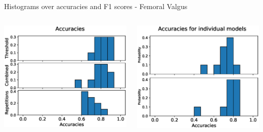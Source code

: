 \begin{frame}[fragile]{Histograms over accuracies and F1 scores - Femoral Valgus}
  \vspace{0.2cm}
  \begin{columns}
  \includegraphics[width=\textwidth]{files/figs/res/femval/acc.eps}

  \includegraphics[width=\textwidth]{files/figs/res/femval/acc-ind.eps}


\end{columns}
\end{frame}
